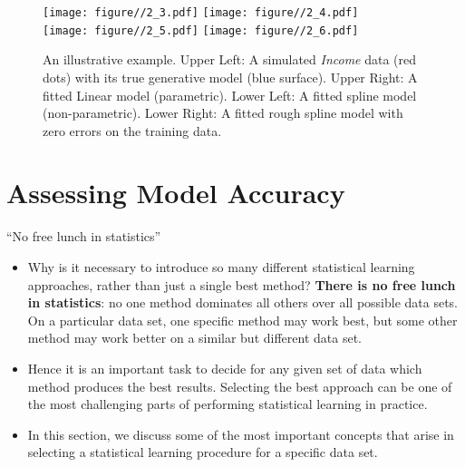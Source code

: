 \documentclass[10pt,a4paper]{beamer}
\begin{document}
\begin{frame}{}
\begin{figure}
  \centering
  \texttt{[image: figure//2\_3.pdf]}
  \texttt{[image: figure//2\_4.pdf]}\\

  \texttt{[image: figure//2\_5.pdf]}
  \texttt{[image: figure//2\_6.pdf]}\\
  \caption{\small An illustrative example. Upper Left: A simulated \emph{Income} data (red dots) with its true generative model (blue surface).
  Upper Right: A fitted Linear model (parametric). Lower Left: A fitted spline model (non-parametric). Lower Right: A fitted rough spline model with zero errors on the training data. }\label{}
\end{figure}


\end{frame}

\section{Assessing Model Accuracy}

\begin{frame}{``No free lunch in statistics''}

\begin{itemize}
  \item Why is it necessary to introduce so many different
statistical learning approaches, rather than just a single best method? \textbf{There
is no free lunch in statistics}: no one method dominates all others over all possible data sets. On a particular data set, one specific method may work
best, but some other method may work better on a similar but different
data set.
  \item Hence it is an important task to decide for any given set of data
which method produces the best results. Selecting the best approach can
be one of the most challenging parts of performing statistical learning in
practice.
  \item In this section, we discuss some of the most important concepts that
arise in selecting a statistical learning procedure for a specific data set.
\end{itemize}
\end{frame}
\end{document}
